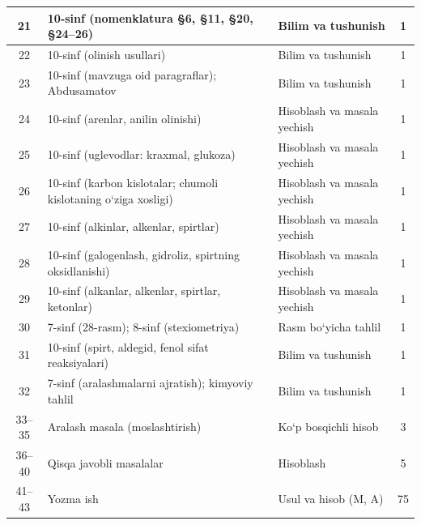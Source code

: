 \documentclass[11pt,a4paper]{article}
\begin{document}
{\begin{longtable}{|c|p{7.2cm}|p{5.4cm}|c|}
21 & 10-sinf (nomenklatura \S{}6, \S{}11, \S{}20, \S{}24--26) & Bilim va tushunish & 1\\\hline
22 & 10-sinf (olinish usullari) & Bilim va tushunish & 1\\\hline
23 & 10-sinf (mavzuga oid paragraflar); Abdusamatov & Bilim va tushunish & 1\\\hline
24 & 10-sinf (arenlar, anilin olinishi) & Hisoblash va masala yechish & 1\\\hline
25 & 10-sinf (uglevodlar: kraxmal, glukoza) & Hisoblash va masala yechish & 1\\\hline
26 & 10-sinf (karbon kislotalar; chumoli kislotaning o`ziga xosligi) & Hisoblash va masala yechish & 1\\\hline
27 & 10-sinf (alkinlar, alkenlar, spirtlar) & Hisoblash va masala yechish & 1\\\hline
28 & 10-sinf (galogenlash, gidroliz, spirtning oksidlanishi) & Hisoblash va masala yechish & 1\\\hline
29 & 10-sinf (alkanlar, alkenlar, spirtlar, ketonlar) & Hisoblash va masala yechish & 1\\\hline
30 & 7-sinf (28-rasm); 8-sinf (stexiometriya) & Rasm bo`yicha tahlil & 1\\\hline
31 & 10-sinf (spirt, aldegid, fenol sifat reaksiyalari) & Bilim va tushunish & 1\\\hline
32 & 7-sinf (aralashmalarni ajratish); kimyoviy tahlil & Bilim va tushunish & 1\\\hline
33--35 & Aralash masala (moslashtirish) & Ko`p bosqichli hisob & 3\\\hline
36--40 & Qisqa javobli masalalar & Hisoblash & 5\\\hline
41--43 & Yozma ish & Usul va hisob (M, A) & 75\\\hline
\end{longtable}}
\end{document}
